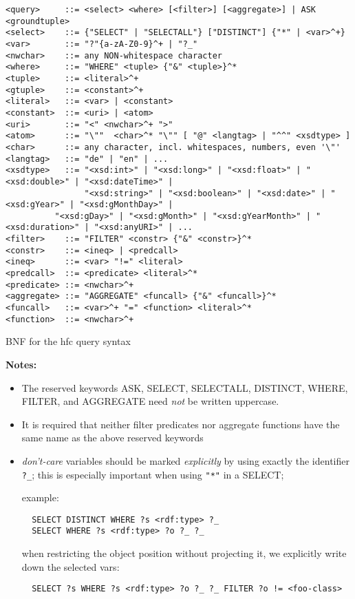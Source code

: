 

\begin{table}
\begin{verbatim}
<query>     ::= <select> <where> [<filter>] [<aggregate>] | ASK <groundtuple>
<select>    ::= {"SELECT" | "SELECTALL"} ["DISTINCT"] {"*" | <var>^+}
<var>       ::= "?"{a-zA-Z0-9}^+ | "?_"
<nwchar>    ::= any NON-whitespace character
<where>     ::= "WHERE" <tuple> {"&" <tuple>}^*
<tuple>     ::= <literal>^+
<gtuple>    ::= <constant>^+
<literal>   ::= <var> | <constant>
<constant>  ::= <uri> | <atom>
<uri>       ::= "<" <nwchar>^+ ">"
<atom>      ::= "\""  <char>^* "\"" [ "@" <langtag> | "^^" <xsdtype> ]
<char>      ::= any character, incl. whitespaces, numbers, even '\"'
<langtag>   ::= "de" | "en" | ...
<xsdtype>   ::= "<xsd:int>" | "<xsd:long>" | "<xsd:float>" | "<xsd:double>" | "<xsd:dateTime>" |
                "<xsd:string>" | "<xsd:boolean>" | "<xsd:date>" | "<xsd:gYear>" | "<xsd:gMonthDay>" |
          "<xsd:gDay>" | "<xsd:gMonth>" | "<xsd:gYearMonth>" | "<xsd:duration>" | "<xsd:anyURI>" | ...
<filter>    ::= "FILTER" <constr> {"&" <constr>}^*
<constr>    ::= <ineq> | <predcall>
<ineq>      ::= <var> "!=" <literal>
<predcall>  ::= <predicate> <literal>^*
<predicate> ::= <nwchar>^+
<aggregate> ::= "AGGREGATE" <funcall> {"&" <funcall>}^*
<funcall>   ::= <var>^+ "=" <function> <literal>^*
<function>  ::= <nwchar>^+
\end{verbatim}
\caption{BNF for the hfc query syntax}
\end{table}

\textbf{Notes:}
\begin{itemize}
\item The reserved keywords ASK, SELECT, SELECTALL, DISTINCT, WHERE, FILTER, and
AGGREGATE need \emph{not} be written uppercase.

\item It is required that neither filter predicates nor aggregate functions have the same name as the above reserved keywords
\item \emph{don't-care} variables should be marked \emph{explicitly} by using
  exactly the identifier \texttt{?\_}; this is especially important when using
  \texttt{"*"} in a SELECT;

  example:
\begin{verbatim}
  SELECT DISTINCT WHERE ?s <rdf:type> ?_
  SELECT WHERE ?s <rdf:type> ?o ?_ ?_
\end{verbatim}

  when restricting the object position without projecting it, we explicitly
  write down the selected vars:
\begin{verbatim}
  SELECT ?s WHERE ?s <rdf:type> ?o ?_ ?_ FILTER ?o != <foo-class>
\end{verbatim}
\end{itemize}

